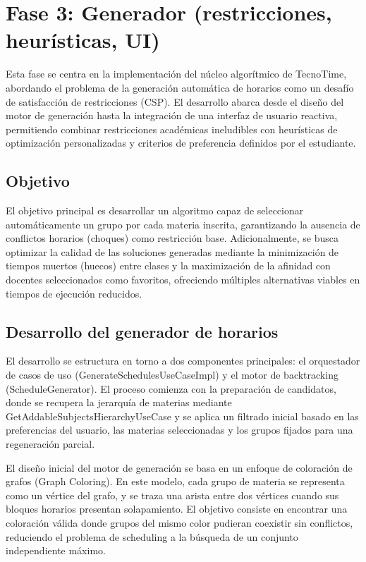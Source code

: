 \section{Fase 3: Generador (restricciones, heurísticas, UI)}

Esta fase se centra en la implementación del núcleo algorítmico de TecnoTime, abordando el problema de la generación automática de horarios como un desafío de satisfacción de restricciones (CSP). El desarrollo abarca desde el diseño del motor de generación hasta la integración de una interfaz de usuario reactiva, permitiendo combinar restricciones académicas ineludibles con heurísticas de optimización personalizadas y criterios de preferencia definidos por el estudiante.

\subsection{Objetivo}
El objetivo principal es desarrollar un algoritmo capaz de seleccionar automáticamente un grupo por cada materia inscrita, garantizando la ausencia de conflictos horarios (choques) como restricción base. Adicionalmente, se busca optimizar la calidad de las soluciones generadas mediante la minimización de tiempos muertos (huecos) entre clases y la maximización de la afinidad con docentes seleccionados como favoritos, ofreciendo múltiples alternativas viables en tiempos de ejecución reducidos.

\subsection{Desarrollo del generador de horarios}
El desarrollo se estructura en torno a dos componentes principales: el orquestador de casos de uso (GenerateSchedulesUseCaseImpl) y el motor de backtracking (ScheduleGenerator). El proceso comienza con la preparación de candidatos, donde se recupera la jerarquía de materias mediante GetAddableSubjectsHierarchyUseCase y se aplica un filtrado inicial basado en las preferencias del usuario, las materias seleccionadas y los grupos fijados para una regeneración parcial.

El diseño inicial del motor de generación se basa en un enfoque de coloración de grafos (Graph Coloring). En este modelo, cada grupo de materia se representa como un vértice del grafo, y se traza una arista entre dos vértices cuando sus bloques horarios presentan solapamiento. El objetivo consiste en encontrar una coloración válida donde grupos del mismo color pudieran coexistir sin conflictos, reduciendo el problema de scheduling a la búsqueda de un conjunto independiente máximo.

